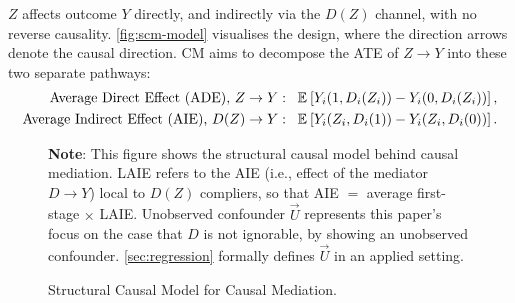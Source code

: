 $Z$ affects outcome $Y$ directly, and indirectly via the $D(Z)$ channel, with no reverse causality.
\autoref{fig:scm-model} visualises the design, where the direction arrows denote the causal direction.
CM aims to decompose the ATE of $Z \to Y$ into these two separate pathways:
\begin{align*}
    \text{Average Direct Effect (ADE), } Z \to Y: \;\;\;&
        \mathbb{E}_{} \left[ Y_i(1, D_i(Z_i)) - Y_i(0, D_i(Z_i)) \right], \\
    \text{Average Indirect Effect (AIE), } D(Z) \to Y: \;\;\;&
            \mathbb{E}_{} \left[ Y_i(Z_i, D_i(1)) - Y_i(Z_i, D_i(0)) \right].
\end{align*}

\begin{figure}[h!]
    \centering
    \singlespacing
    \caption{Structural Causal Model for Causal Mediation.}
    \label{fig:scm-model}
    \justify
    \footnotesize
    \textbf{Note}:
    This figure shows the structural causal model behind causal mediation.
    LAIE refers to the AIE (i.e., effect of the mediator $D \to Y$) local to $D(Z)$ compliers, so that AIE $=$ average first-stage $\times$ LAIE.
    Unobserved confounder $\vec U$ represents this paper's focus on the case that $D$ is not ignorable, by showing an unobserved confounder.
    \autoref{sec:regression} formally defines $\vec U$ in an applied setting.
\end{figure}

